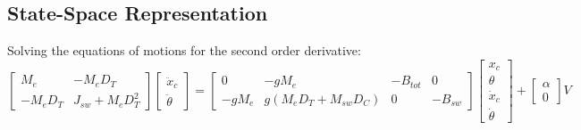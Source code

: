 \documentclass[11pt,a4paper]{article}
\begin{document}
\subsection{State-Space Representation}
Solving the equations of motions for the second order derivative:
\begin{equation}
	\begin{bmatrix}
		M_e     & -M_eD_T           \\
		-M_eD_T & J_{sw} + M_eD_T^2
	\end{bmatrix}
	\begin{bmatrix}
		\ddot{x}_c \\
		\ddot{\theta}
	\end{bmatrix}
	=
	\begin{bmatrix}
		0     & -gM_e                 & -B_{tot} & 0       \\
		-gM_e & g(M_eD_T + M_{sw}D_C) & 0        & -B_{sw}
	\end{bmatrix}
	\begin{bmatrix}
		x_c       \\
		\theta    \\
		\dot{x}_c \\
		\dot{\theta}
	\end{bmatrix}
	+ \begin{bmatrix}
		\alpha \\
		0
	\end{bmatrix}
	V
\end{equation}

\end{document}
